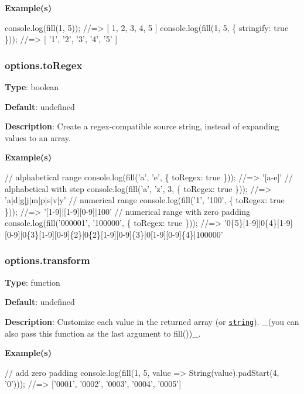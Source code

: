 {\bfseries Example(s)}


\begin{DoxyCode}
console.log(fill(1, 5));                    //=> [ 1, 2, 3, 4, 5 ]
console.log(fill(1, 5, \{ stringify: true \})); //=> [ '1', '2', '3', '4', '5' ]
\end{DoxyCode}


\subsubsection*{options.\+to\+Regex}

{\bfseries Type}\+: {\ttfamily boolean}

{\bfseries Default}\+: {\ttfamily undefined}

{\bfseries Description}\+: Create a regex-\/compatible source string, instead of expanding values to an array.

{\bfseries Example(s)}


\begin{DoxyCode}
// alphabetical range
console.log(fill('a', 'e', \{ toRegex: true \})); //=> '[a-e]'
// alphabetical with step
console.log(fill('a', 'z', 3, \{ toRegex: true \})); //=> 'a|d|g|j|m|p|s|v|y'
// numerical range
console.log(fill('1', '100', \{ toRegex: true \})); //=> '[1-9]|[1-9][0-9]|100'
// numerical range with zero padding
console.log(fill('000001', '100000', \{ toRegex: true \}));
//=> '0\{5\}[1-9]|0\{4\}[1-9][0-9]|0\{3\}[1-9][0-9]\{2\}|0\{2\}[1-9][0-9]\{3\}|0[1-9][0-9]\{4\}|100000'
\end{DoxyCode}


\subsubsection*{options.\+transform}

{\bfseries Type}\+: {\ttfamily function}

{\bfseries Default}\+: {\ttfamily undefined}

{\bfseries Description}\+: Customize each value in the returned array (or \href{#optionstoRegex}{\tt string}). \+\_\+(you can also pass this function as the last argument to {\ttfamily fill()})\+\_\+.

{\bfseries Example(s)}


\begin{DoxyCode}
// add zero padding
console.log(fill(1, 5, value => String(value).padStart(4, '0')));
//=> ['0001', '0002', '0003', '0004', '0005']
\end{DoxyCode}


